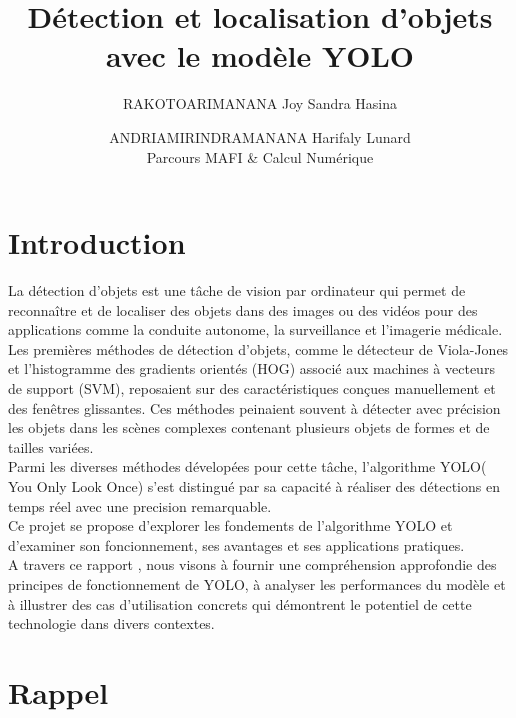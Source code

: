 \documentclass[11pt,a4paper]{article}
\title{Détection et localisation d’objets avec le modèle YOLO}
\author{RAKOTOARIMANANA Joy Sandra Hasina \and ANDRIAMIRINDRAMANANA Harifaly Lunard
\\[0.3cm]
    \small Parcours MAFI \& Calcul Numérique}
\date{}
\begin{document}
\maketitle


\tableofcontents
\newpage

\section{Introduction}


La détection d’objets est une tâche de vision par ordinateur qui permet de reconnaître et de localiser des objets dans des images ou des vidéos pour des applications comme la conduite autonome, la surveillance et l’imagerie médicale. Les premières méthodes de détection d’objets, comme le détecteur de Viola-Jones et l’histogramme des gradients orientés (HOG) associé aux machines à vecteurs de support (SVM), reposaient sur des caractéristiques conçues manuellement et des fenêtres glissantes. Ces méthodes peinaient souvent à détecter avec précision les objets dans les scènes complexes contenant plusieurs objets de formes et de tailles variées.\\[0.1cm]
Parmi les diverses méthodes dévelopées pour cette tâche, l'algorithme YOLO( You Only Look Once) s'est distingué par sa capacité à réaliser des détections en temps réel avec une precision remarquable.\\[0.1cm]
Ce projet se propose d'explorer les fondements de l'algorithme YOLO et d'examiner son foncionnement, ses avantages et ses applications pratiques.\\[0.1cm]
A travers ce rapport , nous visons à fournir une compréhension approfondie des principes de fonctionnement de YOLO, à analyser les performances du modèle et à illustrer des cas d'utilisation concrets qui démontrent le potentiel de cette technologie dans divers contextes.

\section{Rappel}
\end{document}
